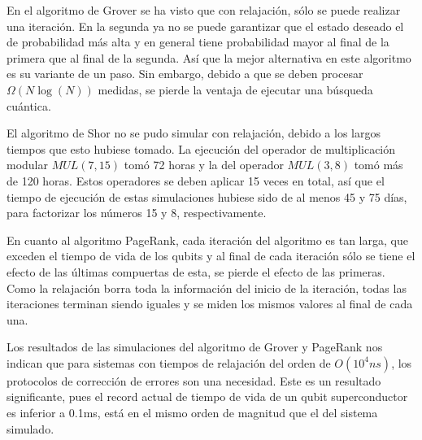 En el algoritmo de Grover se ha visto que con relajación, sólo se puede realizar una iteración. En la segunda ya no se puede garantizar que el estado deseado el de probabilidad más alta y en general tiene probabilidad mayor al final de la primera que al final de la segunda. Así que la mejor alternativa en este algoritmo es su variante de un paso. Sin embargo, debido a que se deben procesar $\Omega(N \log(N))$ medidas, se pierde la ventaja de ejecutar una búsqueda cuántica.

El algoritmo de Shor no se pudo simular con relajación, debido a los largos tiempos que esto hubiese tomado. La ejecución del operador de multiplicación modular $MUL(7,15)$ tomó 72 horas y la del operador $MUL(3,8)$ tomó más de 120 horas. Estos operadores se deben aplicar 15 veces en total, así que el tiempo de ejecución de estas simulaciones hubiese sido de al menos 45 y 75 días, para factorizar los números 15 y 8, respectivamente.

En cuanto al algoritmo PageRank, cada iteración del algoritmo es tan larga, que exceden el tiempo de vida de los qubits y al final de cada iteración sólo se tiene el efecto de las últimas compuertas de esta, se pierde el efecto de las primeras. Como la relajación borra toda la información del inicio de la iteración, todas las iteraciones terminan siendo iguales y se miden los mismos valores al final de cada una.

Los resultados de las simulaciones del algoritmo de Grover y PageRank nos indican que para sistemas con tiempos de relajación del orden de $O(10^4 ns)$, los protocolos de corrección de errores son una necesidad. Este es un resultado significante, pues el record actual de tiempo de vida de un qubit superconductor es inferior a 0.1ms, está en el mismo orden de magnitud que el del sistema simulado.
